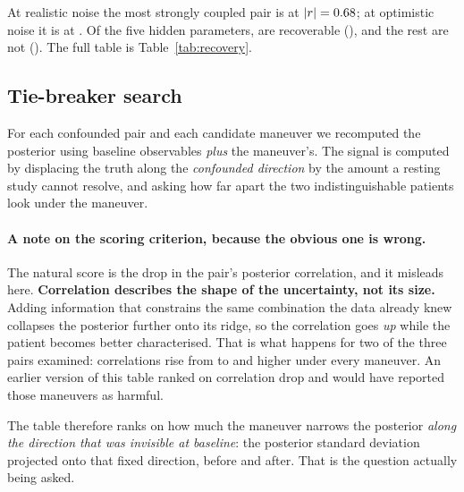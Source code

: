 \documentclass[11pt,a4paper]{article}
\newcommand{\claim}[1]{\textcolor{accent}{\textbf{#1}}}
\begin{document}
At realistic noise the most strongly coupled pair is \topPairRealistic{} at
$|r| = 0.68$; at optimistic noise it is \topPairOptimistic{} at
\topPairCorrelationOptimistic. Of the five hidden parameters, \nRecoverable{} are recoverable
(\recoverableNames), and the rest are not (\unrecoverableNames). The full table is
Table~\ref{tab:recovery}.


\label{tab:recovery}

\subsection{Tie-breaker search}

For each confounded pair and each candidate maneuver we recomputed the posterior using
baseline observables \emph{plus} the maneuver's. The signal is computed by displacing the
truth along the \emph{confounded direction} by the amount a resting study cannot resolve,
and asking how far apart the two indistinguishable patients look under the maneuver.

\paragraph{A note on the scoring criterion, because the obvious one is wrong.} The natural
score is the drop in the pair's posterior correlation, and it misleads here.
\claim{Correlation describes the shape of the uncertainty, not its size.} Adding information
that constrains the same combination the data already knew collapses the posterior further
onto its ridge, so the correlation goes \emph{up} while the patient becomes better
characterised. That is what happens for two of the three pairs examined: correlations rise
from \bestCorrelationBefore{} to \bestCorrelationAfter{} and higher under every maneuver. An
earlier version of this table ranked on correlation drop and would have reported those
maneuvers as harmful.

The table therefore ranks on how much the maneuver narrows the posterior \emph{along the
direction that was invisible at baseline}: the posterior standard deviation projected onto
that fixed direction, before and after. That is the question actually being asked.


\label{tab:tiebreaker}
\end{document}
